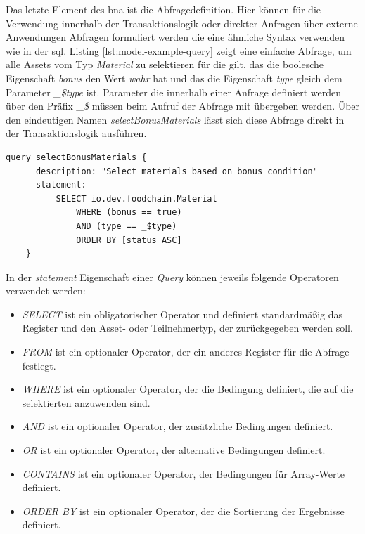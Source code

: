 \noindent
Das letzte Element des \acf{bna} ist die Abfragedefinition. Hier können für die Verwendung innerhalb der Transaktionslogik oder direkter Anfragen über externe Anwendungen Abfragen formuliert werden die eine ähnliche Syntax verwenden wie in der \ac{sql}. Listing \ref{lst:model-example-query} zeigt eine einfache Abfrage, um alle Assets vom Typ \textit{Material} zu selektieren für die gilt, das die boolesche Eigenschaft \textit{bonus} den Wert \textit{wahr} hat und das die Eigenschaft \textit{type} gleich dem Parameter \textit{\_\$type} ist. Parameter die innerhalb einer Anfrage definiert werden über den Präfix \textit{\_\$} müssen beim Aufruf der Abfrage mit übergeben werden. Über den eindeutigen Namen \textit{selectBonusMaterials} lässt sich diese Abfrage direkt in der Transaktionslogik ausführen.

\begin{lstlisting}[caption={Abfragedefinition},label=lst:model-example-query]
    query selectBonusMaterials {
      description: "Select materials based on bonus condition"
      statement:
          SELECT io.dev.foodchain.Material
              WHERE (bonus == true)
              AND (type == _$type)
              ORDER BY [status ASC]
    }
\end{lstlisting}

\noindent
In der \textit{statement} Eigenschaft einer \textit{Query} können jeweils folgende Operatoren verwendet werden:

\begin{itemize}
    \item \textit{SELECT} ist ein obligatorischer Operator und definiert standardmäßig das Register und den Asset- oder Teilnehmertyp, der zurückgegeben werden soll.
    \item \textit{FROM} ist ein optionaler Operator, der ein anderes Register für die Abfrage festlegt.
    \item \textit{WHERE} ist ein optionaler Operator, der die Bedingung definiert, die auf die selektierten anzuwenden sind.
    \item \textit{AND} ist ein optionaler Operator, der zusätzliche Bedingungen definiert.
    \item \textit{OR} ist ein optionaler Operator, der alternative Bedingungen definiert.
    \item \textit{CONTAINS} ist ein optionaler Operator, der Bedingungen für Array-Werte definiert.
    \item \textit{ORDER BY} ist ein optionaler Operator, der die Sortierung der Ergebnisse definiert.
\end{itemize}

